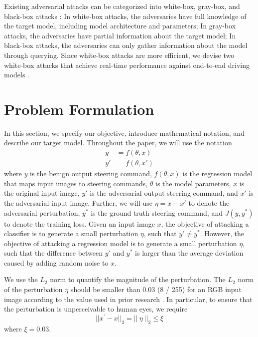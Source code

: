 Existing adversarial attacks can be categorized into white-box, gray-box, and black-box attacks \citep{REN2020346}: In white-box attacks, the adversaries have full knowledge of the target model, including model architecture and parameters; In gray-box attacks, the adversaries have partial information about the target model; In black-box attacks, the adversaries can only gather information about the model through querying. Since white-box attacks are more efficient, we devise two white-box attacks that achieve real-time performance against end-to-end driving models .


\section{Problem Formulation}
\label{section_problem_formulation}

In this section, we specify our objective, introduce mathematical notation, and describe our target model. Throughout the paper, we will use the notation
\begin{align}
y&=f(\theta, x) \\
y'&=f(\theta, x')
\end{align}
where $y$ is the benign output steering command, $f(\theta, x)$ is the regression model that maps input images to steering commands, $\theta$ is the model parameters, $x$ is the original input image, $y'$ is the adversarial output steering command, and $x'$ is the adversarial input image. Further, we will use $\eta=x-x'$ to denote the adversarial perturbation, $y^{*}$ is the ground truth steering command, and $J(y, y^{*})$ to denote the training loss. Given an input image $x$, the objective of attacking a classifier is to generate a small perturbation $\eta$, such that $y' \neq y^{*}$. However, the objective of attacking a regression model is to generate a small perturbation $\eta$, such that the difference between $y'$ and $y^{*}$ is larger than the average deviation caused by adding random noise to $x$. 

We use the $L_2$ norm to quantify the magnitude of the perturbation. The $L_2$ norm of the perturbation $\eta$ should be smaller than 0.03 (8 / 255) for an RGB input image according to the value used in prior research \citep{chow2020adversarial} \citep{ACFH2020square}. In particular, to ensure that the perturbation is unperceivable to human eyes, we require \begin{equation}
||x^{'}-x||_{2} = ||\ {\eta}\ ||_{2} \leq \xi
\end{equation}
where $\xi = 0.03$.

